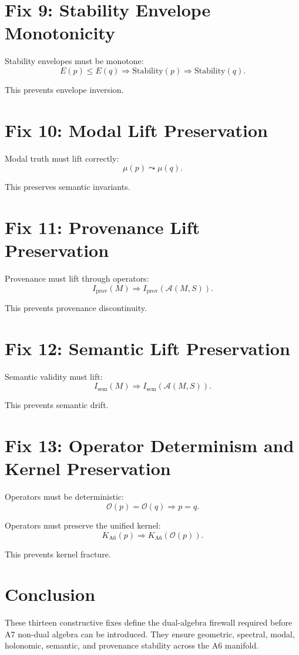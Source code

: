 \documentclass[11pt]{article}
\begin{document}
\section{Fix 9: Stability Envelope Monotonicity}

Stability envelopes must be monotone:
\[
E(p) \le E(q) \Rightarrow \text{Stability}(p) \Rightarrow \text{Stability}(q).
\]

This prevents envelope inversion.

\section{Fix 10: Modal Lift Preservation}

Modal truth must lift correctly:
\[
\mu(p) \leadsto \mu(q).
\]

This preserves semantic invariants.

\section{Fix 11: Provenance Lift Preservation}

Provenance must lift through operators:
\[
I_{\mathrm{prov}}(M) \Rightarrow I_{\mathrm{prov}}(\mathcal{A}(M,S)).
\]

This prevents provenance discontinuity.

\section{Fix 12: Semantic Lift Preservation}

Semantic validity must lift:
\[
I_{\mathrm{sem}}(M) \Rightarrow I_{\mathrm{sem}}(\mathcal{A}(M,S)).
\]

This prevents semantic drift.

\section{Fix 13: Operator Determinism and Kernel Preservation}

Operators must be deterministic:
\[
\mathcal{O}(p) = \mathcal{O}(q) \Rightarrow p = q.
\]

Operators must preserve the unified kernel:
\[
K_{\mathrm{A6}}(p) \Rightarrow K_{\mathrm{A6}}(\mathcal{O}(p)).
\]

This prevents kernel fracture.

\section{Conclusion}

These thirteen constructive fixes define the dual-algebra firewall required
before A7 non-dual algebra can be introduced. They ensure geometric, spectral,
modal, holonomic, semantic, and provenance stability across the A6 manifold.
\end{document}
